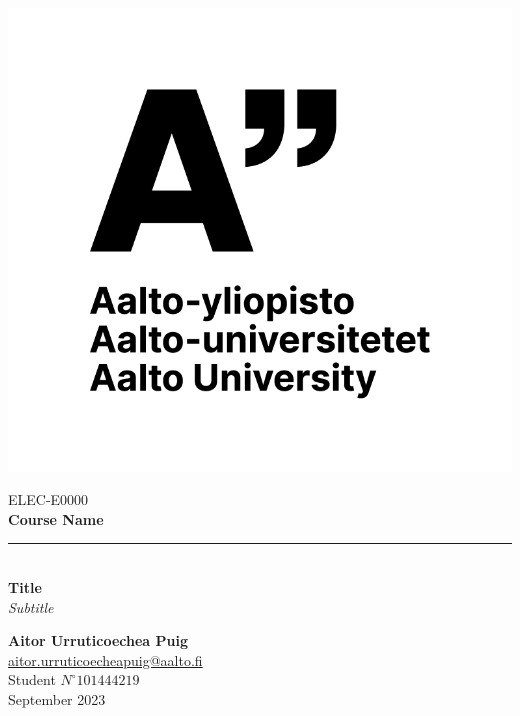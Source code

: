 \thispagestyle{empty}
\vspace{-2cm}
\includegraphics[]{Figures/Aalto Logo/logo-quote-big.png}

\vspace{4.5cm}

\raggedleft
ELEC-E0000 \\
\large{\textbf{Course Name}} \\
\noindent\rule{7cm}{0.4pt} \\
\Huge{\textbf{Title}}
\\
\Large{\textit{Subtitle}}

\vspace{4.2cm}

\normalsize{\textbf{Aitor Urruticoechea Puig}} \\
\small{\url{aitor.urruticoecheapuig@aalto.fi}\\}
\normalsize{Student $N^{\circ}101444219$} \\
September 2023

\justifying

